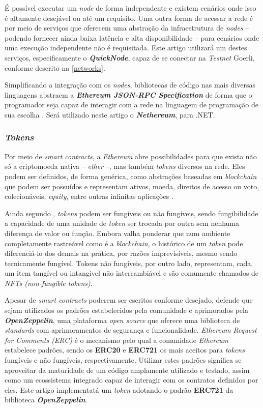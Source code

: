 {É possível executar um \textit{node} de forma independente e existem cenários onde isso é altamente desejável ou até um requisito. Uma outra forma de acessar a rede é por meio de serviços que oferecem uma abstração da infraestrutura de \textit{nodes} -- podendo fornecer ainda baixa latência e alta disponibilidade -- para cenários onde uma execução independente não é requisitada. Este artigo utilizará um destes serviços, especificamente o \textit{\textbf{QuickNode}}, capaz de se conectar na \textit{Testnet} Goerli, conforme descrito na \ref{networks}.

Simplificando a integração com os \textit{nodes}, bibliotecas de código nas mais diversas linguagens abstraem a \textit{\textbf{Ethereum JSON-RPC Specification}} de forma que o programador seja capaz de interagir com a rede na linguagem de programação de sua escolha \cite{ethereumorgrpc}. Será utilizado neste artigo o \textit{\textbf{Nethereum}}, para .NET.

\subsubsection{\esp \textit{Tokens}}
Por meio de \textit{smart contracts}, a \textit{Ethereum} abre possibilidades para que exista não só a criptomoeda nativa -- \textit{ether} --, mas também \textit{tokens} diversos na rede. Eles podem ser definidos, de forma genérica, como abstrações baseadas em \textit{blockchain} que podem ser possuídos e representam ativos, moeda, direitos de acesso ou voto, colecionáveis, \textit{equity}, entre outras infinitas aplicações \cite{antonopoulos2018mastering}.

Ainda segundo , \textit{tokens} podem ser fungíveis ou não fungíveis, sendo fungibilidade a capacidade de uma unidade de \textit{token} ser trocada por outra sem nenhuma diferença de valor ou função. Embora valha ponderar que num ambiente completamente rastreável como é a \textit{blockchain}, o histórico de um \textit{token} pode diferenciá-lo dos demais na prática, por razões imprevisíveis, mesmo sendo tecnicamente fungível. Tokens não fungíveis, por outro lado, representam, cada, um item tangível ou intangível não intercambiável e são comumente chamados de \textit{NFTs (non-fungible tokens)}.

Apesar de \textit{smart contracts} poderem ser escritos conforme desejado,  defende que sejam utilizados os padrões estabelecidos pela comunidade e aprimorados pela \textit{\textbf{OpenZeppelin}}, uma plataforma \textit{open source} que oferece uma biblioteca de \textit{standards} com aprimoramentos de segurança e funcionalidade. \textit{Ethereum Request for Comments (ERC)} é o mecanismo pelo qual a comunidade \textit{Ethereum} estabelece padrões, sendo os \textbf{ERC20} e \textbf{ERC721} os mais aceitos para \textit{tokens} fungíveis e não fungíveis, respectivamente. Utilizar estes padrões significa se aproveitar da maturidade de um código amplamente utilizado e testado, assim como um ecossistema integrado capaz de interagir com os contratos definidos por eles. Este artigo implementatá um \textit{token} adotando o padrão \textbf{ERC721} da biblioteca \textit{\textbf{OpenZeppelin}}.

}
